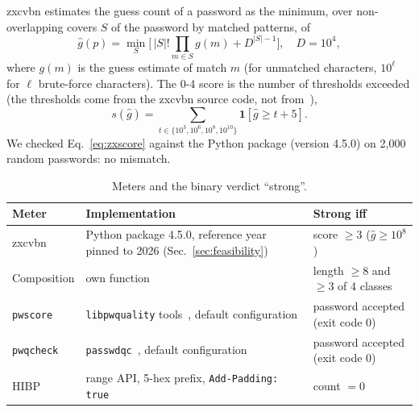 \documentclass[conference]{IEEEtran}
\begin{document}
zxcvbn estimates the guess count of a password as the minimum, over non-overlapping covers $S$ of the password by matched patterns, of~\cite{wheeler2016}
\begin{equation}\label{eq:zx}
\hat g(p)=\min_{S}\Big[\,|S|!\prod_{m\in S} g(m)+D^{|S|-1}\Big],\quad D=10^4,
\end{equation}
where $g(m)$ is the guess estimate of match $m$ (for unmatched characters, $10^{\ell}$ for $\ell$ brute-force characters). The 0-4 score is the number of thresholds exceeded (the thresholds come from the zxcvbn source code, not from~\cite{wheeler2016}),
\begin{equation}\label{eq:zxscore}
s(\hat g)=\sum_{t\in\{10^3,10^6,10^8,10^{10}\}}\mathbf 1\!\left[\hat g\ge t+5\right].
\end{equation}
We checked Eq.~\eqref{eq:zxscore} against the Python package (version 4.5.0) on 2{,}000 random passwords: no mismatch.

\begin{table}[t]
\centering
\caption{Meters and the binary verdict ``strong''.}
\label{tab:meters}
\footnotesize
\renewcommand{\arraystretch}{1.12}
\begin{tabularx}{\columnwidth}{@{}l Y Y@{}}
\toprule
\textbf{Meter} & \textbf{Implementation} & \textbf{Strong iff}\\
\midrule
zxcvbn & Python package 4.5.0, reference year pinned to 2026 (Sec.~\ref{sec:feasibility}) & score $\ge3$ ($\hat g\ge10^8$)\\
Composition & own function & length $\ge8$ and $\ge3$ of 4 classes\\
\texttt{pwscore} & \texttt{libpwquality} tools~\cite{pwquality}, default configuration & password accepted (exit code 0)\\
\texttt{pwqcheck} & \texttt{passwdqc}~\cite{passwdqc}, default configuration & password accepted (exit code 0)\\
HIBP & range API, 5-hex prefix, \texttt{Add-Padding: true}~\cite{hibp} & count $=0$\\
\bottomrule
\end{tabularx}
\end{table}
\end{document}
